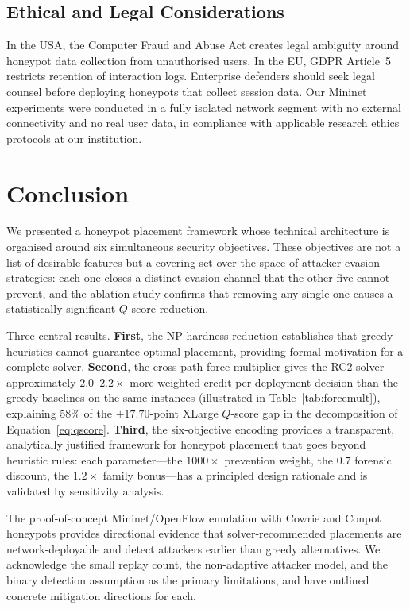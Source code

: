 \documentclass[journal]{IEEEtran}
\newcommand{\qscore}{$Q$-score}
\begin{document}
\subsection{Ethical and Legal Considerations}
In the USA, the Computer Fraud and Abuse Act creates legal ambiguity
around honeypot data collection from unauthorised users. In the EU,
GDPR Article~5 restricts retention of interaction logs. Enterprise
defenders should seek legal counsel before deploying honeypots that
collect session data. Our Mininet experiments were conducted in a
fully isolated network segment with no external connectivity and no
real user data, in compliance with applicable research ethics
protocols at our institution.

\section{Conclusion}
\label{sec:conclusion}

We presented a honeypot placement framework whose technical
architecture is organised around six simultaneous security
objectives. These objectives are not a list of desirable features
but a covering set over the space of attacker evasion strategies:
each one closes a distinct evasion channel that the other five
cannot prevent, and the ablation study confirms that removing any
single one causes a statistically significant \qscore{} reduction.

Three central results. \textbf{First}, the NP-hardness reduction
establishes that greedy heuristics cannot guarantee optimal
placement, providing formal motivation for a complete solver.
\textbf{Second}, the cross-path force-multiplier gives the RC2
solver approximately $2.0$--$2.2\times$ more weighted credit per
deployment decision than the greedy baselines on the same instances
(illustrated in Table~\ref{tab:forcemult}), explaining 58\% of the
$+17.70$-point XLarge \qscore{} gap in the decomposition of
Equation~\eqref{eq:qscore}.
\textbf{Third}, the six-objective encoding provides a transparent,
analytically justified framework for honeypot placement that goes
beyond heuristic rules: each parameter---the $1000\times$ prevention
weight, the $0.7$ forensic discount, the $1.2\times$ family
bonus---has a principled design rationale and is validated by
sensitivity analysis.

The proof-of-concept Mininet/OpenFlow emulation with Cowrie and
Conpot honeypots provides directional evidence that solver-recommended
placements are network-deployable and detect attackers earlier than
greedy alternatives. We acknowledge the small replay count, the
non-adaptive attacker model, and the binary detection assumption as
the primary limitations, and have outlined concrete mitigation
directions for each.
\end{document}

